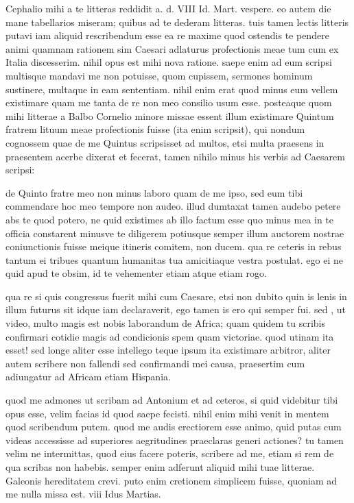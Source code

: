 


 Cephalio mihi a te litteras reddidit a. d. VIII Id. Mart. vespere. eo autem die mane tabellarios miseram; quibus ad te dederam litteras. tuis tamen lectis litteris putavi iam aliquid rescribendum esse ea re maxime quod ostendis te pendere animi quamnam rationem sim Caesari adlaturus profectionis meae tum cum ex Italia discesserim. nihil opus est mihi nova ratione. saepe enim ad eum scripsi multisque mandavi me non potuisse, quom cupissem, sermones hominum sustinere, multaque in eam sententiam. nihil enim erat quod minus eum vellem existimare quam me tanta de re non meo consilio usum esse. posteaque quom mihi litterae a Balbo Cornelio minore missae essent illum existimare Quintum fratrem lituum meae profectionis fuisse (ita enim scripsit), qui nondum cognossem quae de me Quintus scripsisset ad multos, etsi multa praesens in praesentem acerbe dixerat et fecerat, tamen nihilo minus his verbis ad Caesarem scripsi:

 de Quinto fratre meo non minus laboro quam de me ipso, sed eum tibi commendare hoc meo tempore non audeo. illud dumtaxat tamen audebo petere abs te quod potero, ne quid existimes ab illo factum esse quo minus mea in te officia constarent minusve te diligerem potiusque semper illum auctorem nostrae coniunctionis fuisse meique itineris comitem, non ducem. qua re ceteris in rebus tantum ei tribues quantum humanitas tua amicitiaque vestra postulat. ego ei ne quid apud te obsim, id te vehementer etiam atque etiam rogo.

 qua re si quis congressus fuerit mihi cum Caesare, etsi non dubito quin is lenis in illum futurus sit idque iam declaraverit, ego tamen is ero qui semper fui. sed , ut video, multo magis est nobis laborandum de Africa; quam quidem tu scribis confirmari cotidie magis ad condicionis spem quam victoriae. quod utinam ita esset! sed longe aliter esse intellego teque ipsum ita existimare arbitror, aliter autem scribere non fallendi sed confirmandi mei causa, praesertim cum adiungatur ad Africam etiam Hispania.

 quod me admones ut scribam ad Antonium et ad ceteros, si quid videbitur tibi opus esse, velim facias id quod saepe fecisti. nihil enim mihi venit in mentem quod scribendum putem. quod me audis erectiorem esse animo, quid putas cum videas accessisse ad superiores aegritudines praeclaras generi actiones? tu tamen velim ne intermittas, quod eius facere poteris, scribere ad me, etiam si rem de qua scribas non habebis. semper enim adferunt aliquid mihi tuae litterae. Galeonis hereditatem crevi. puto enim cretionem simplicem fuisse, quoniam ad me nulla missa est. viii Idus Martias.
